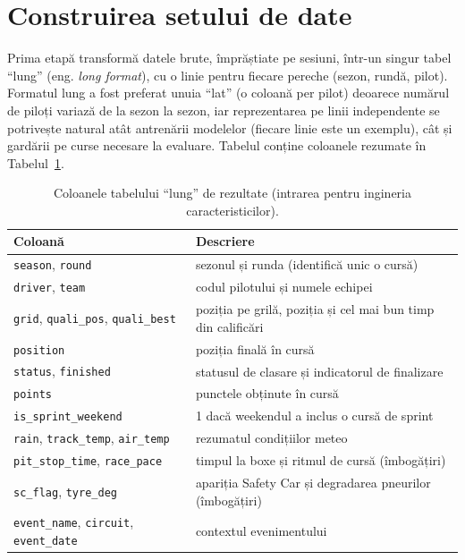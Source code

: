\documentclass[12pt,a4paper]{report}
\begin{document}
\section{Construirea setului de date}
\label{sec:construire}

Prima etapă transformă datele brute, împrăștiate pe sesiuni, într-un singur tabel ``lung'' (eng.
\emph{long format}), cu o linie pentru fiecare pereche (sezon, rundă, pilot). Formatul lung a fost
preferat unuia ``lat'' (o coloană per pilot) deoarece numărul de piloți variază de la sezon la
sezon, iar reprezentarea pe linii independente se potrivește natural atât antrenării modelelor
(fiecare linie este un exemplu), cât și gardării pe curse necesare la evaluare. Tabelul conține
coloanele rezumate în Tabelul~\ref{tab:coloane}.

\begin{table}[htbp]
  \centering
  \begin{tabular}{l l}
    \toprule
    \textbf{Coloană} & \textbf{Descriere} \\
    \midrule
    \texttt{season}, \texttt{round}     & sezonul și runda (identifică unic o cursă) \\
    \texttt{driver}, \texttt{team}      & codul pilotului și numele echipei \\
    \texttt{grid}, \texttt{quali\_pos}, \texttt{quali\_best}  & poziția pe grilă, poziția și cel mai bun timp din calificări \\
    \texttt{position}                   & poziția finală în cursă \\
    \texttt{status}, \texttt{finished}  & statusul de clasare și indicatorul de finalizare \\
    \texttt{points}                     & punctele obținute în cursă \\
    \texttt{is\_sprint\_weekend}        & 1 dacă weekendul a inclus o cursă de sprint \\
    \texttt{rain}, \texttt{track\_temp}, \texttt{air\_temp} & rezumatul condițiilor meteo \\
    \texttt{pit\_stop\_time}, \texttt{race\_pace} & timpul la boxe și ritmul de cursă (îmbogățiri) \\
    \texttt{sc\_flag}, \texttt{tyre\_deg} & apariția Safety Car și degradarea pneurilor (îmbogățiri) \\
    \texttt{event\_name}, \texttt{circuit}, \texttt{event\_date} & contextul evenimentului \\
    \bottomrule
  \end{tabular}
  \caption{Coloanele tabelului ``lung'' de rezultate (intrarea pentru ingineria caracteristicilor).}
  \label{tab:coloane}
\end{table}
\end{document}
